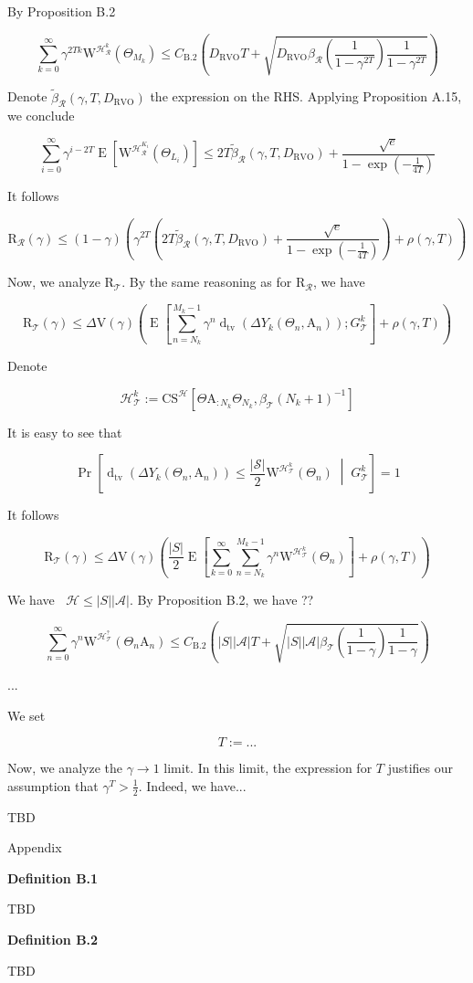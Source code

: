 \documentclass[a4paper]{article}
\newcommand{\Co}[1]{}
\newcommand{\AP}[1]{\left(#1\right)}
\newcommand{\AB}[1]{\left[#1\right]}
\newcommand{\ABM}[2]{\left[#1\;\middle\vert\;#2\right]}
\newcommand{\Abs}[1]{\left\vert #1 \right\vert}
\newcommand{\CPb}[2]{\operatorname{Pr}\ABM{#1}{#2}}
\newcommand{\E}[1]{\operatorname{E}\AB{#1}}
\newcommand{\Dtva}[1]{\operatorname{d}_{\text{tv}}\AP{#1}}
\newcommand{\St}{\mathcal{S}}
\newcommand{\A}{\mathcal{A}}
\newcommand{\R}{\mathcal{R}}
\newcommand{\T}{\mathcal{T}}
\newcommand{\Hy}{\mathcal{H}}
\DeclareMathOperator{\RVO}{\dim_{RVO}}
\newcommand{\DRVO}{D_{\mathrm{RVO}}}
\newcommand{\V}{\mathrm{V}}
\newcommand{\Reg}{\mathrm{R}}
\newcommand{\SHy}{Y}
\newcommand{\AT}{\mathrm{A}}
\newcommand{\ET}{N}
\newcommand{\IT}{M}
\newcommand{\CSE}{G}
\newcommand{\CS}{\mathrm{CS}}
\newcommand{\W}{\mathrm{W}}
\begin{document}
By Proposition B.2

$$\sum_{k=0}^\infty\gamma^{2Tk}\W^{\Hy_\R^{k}}\AP{\Theta_{M_k}}\leq C_{\text{B.2}}\AP{\DRVO T+\sqrt{\DRVO\beta_\R\AP{\frac{1}{1-\gamma^{2T}}}\frac{1}{1-\gamma^{2T}}}}$$

Denote $\tilde{\beta}_\R(\gamma,T,\DRVO)$ the expression on the RHS. Applying Proposition A.15, we conclude

$$\sum_{i=0}^\infty\gamma^{i-2T}\E{\W^{\Hy_\R^{K_i}}\AP{\Theta_{L_i}}}\leq 2T\tilde{\beta}_\R(\gamma,T,\DRVO)+\frac{\sqrt{e}}{1-\exp\AP{-\frac{1}{4T}}}$$

It follows

$$\Reg_\R(\gamma)\leq(1-\gamma)\AP{\gamma^{2T}\AP{2T\tilde{\beta}_\R(\gamma,T,\DRVO)+\frac{\sqrt{e}}{1-\exp\AP{-\frac{1}{4T}}}}+\rho(\gamma,T)}$$

Now, we analyze $\Reg_{\T}$. By the same reasoning as for $\Reg_\R$, we have

$$\Reg_\T(\gamma)\leq\Delta\V(\gamma)\AP{\E{\sum_{n=\ET_k}^{\IT_k-1}\gamma^{n}\Dtva{\Delta\SHy_k\AP{\Theta_n,\AT_n}};\CSE_\T^k}+\rho(\gamma,T)}$$

Denote

$$\Hy_\T^k:=\CS^\Hy\AB{\Theta\AT_{:N_k}\Theta_{N_k},\beta_\T\AP{N_k+1}^{-1}}$$

It is easy to see that

$$\CPb{\Dtva{\Delta\SHy_k\AP{\Theta_n,\AT_n}}\leq\frac{\Abs{\St}}{2}\W^{\Hy_\T^k}\AP{\Theta_n}}{\CSE_\T^k}=1$$

It follows

$$\Reg_\T(\gamma)\leq\Delta\V(\gamma)\AP{\frac{\Abs{S}}{2}\E{\sum_{k=0}^\infty\sum_{n=\ET_k}^{\IT_k-1}\gamma^{n}\W^{\Hy_\T^k}\AP{\Theta_n}}+\rho(\gamma,T)}$$

We have $\RVO\Hy\leq\Abs{S}\Abs{\A}$. By Proposition B.2, we have ??


$$\sum_{n=0}^\infty\gamma^{n}\W^{\Hy_\T^{?}}\AP{\Theta_{n}\AT_n}\leq C_{\text{B.2}}\AP{\Abs{S}\Abs{\A} T+\sqrt{\Abs{S}\Abs{\A}\beta_\T\AP{\frac{1}{1-\gamma}}\frac{1}{1-\gamma}}}$$

...

We set

$$T:=...$$

Now, we analyze the $\gamma\rightarrow1$ limit. In this limit, the expression for $T$ justifies our assumption that $\gamma^T>\frac{1}{2}$. Indeed, we have...

TBD

\begin{Huge}Appendix\end{Huge}

\textbf{Definition B.1}\Co{b}

TBD %

\textbf{Definition B.2}\Co{b}

TBD %
\end{document}
